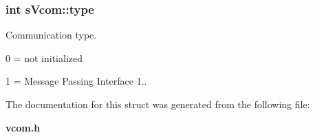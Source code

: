 \subsubsection[{type}]{\setlength{\rightskip}{0pt plus 5cm}int s\-Vcom\-::type}\label{a00001_a060d49d499bd19965c61974be24423ba}


Communication type. \par
 0 = not initialized \par
 1 = Message Passing Interface 1.. 



The documentation for this struct was generated from the following file\-:\begin{DoxyCompactItemize}
\item 
{\bf vcom.\-h}\end{DoxyCompactItemize}

